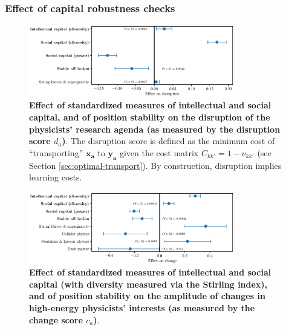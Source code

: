 \documentclass{article}
\begin{document}
\subsubsection{\label{appendix:robustness}Effect of capital robustness checks}


\begin{figure}[H]
    \centering
    \includegraphics[width=0.8\textwidth]{plots/disruption_score_effects_entropy_magnitude.eps}
    \caption{\textbf{Effect of standardized measures of intellectual and social capital, and of position stability on the disruption of the physicists' research agenda (as measured by the disruption score $d_a$)}. The disruption score is defined as the minimum cost of ``transporting'' $\bm{x_a}$ to $\bm{y_a}$ given the cost matrix $C_{kk'}=1-\nu_{kk'}$ (see Section \ref{sec:optimal-transport}). By construction, disruption implies learning costs.  }
    \label{fig:disruption_score_effect}
\end{figure}


\begin{figure}[H]
    \centering
    \includegraphics[width=0.8\textwidth]{plots/change_score_effects_stirling_magnitude.eps}
    \caption{\textbf{Effect of standardized measures of intellectual and social capital (with diversity measured via the Stirling index), and of position stability on the amplitude of changes in high-energy physicists' interests (as measured by the change score $c_a$)}. }
    \label{fig:change_score_effect_stirling}
\end{figure}
\end{document}
